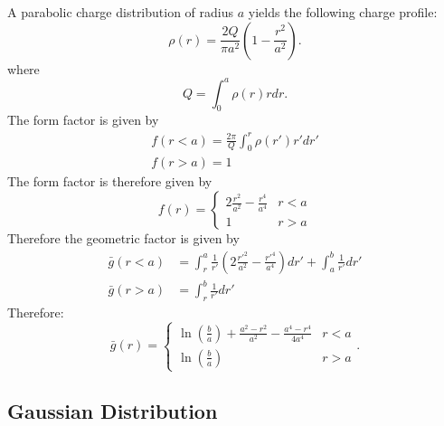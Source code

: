 A parabolic charge distribution of radius $a$ yields the following charge profile:
$$\rho(r) = \frac{2Q}{\pi a^2}\left(1-\frac{r^2}{a^2}\right).$$
where
$$Q = \int_0^a \rho(r) r dr.$$
The form factor is given by
$$\begin{aligned}f(r<a) = \frac{2\pi}{Q}\int_0^r\rho(r')r'dr' \\ f(r > a) = 1\end{aligned}$$
The form factor is therefore given by
$$f(r) = \begin{cases} 2\frac{r^2}{a^2}-\frac{r^4}{a^4} & r < a\\
1 & r > a
\end{cases}$$
Therefore the geometric factor is given by
$$\begin{aligned}
\bar{g}(r<a) & = \int_r^a \frac{1}{r'}\left(2\frac{r'^2}{a^2}-\frac{r'^4}{a^4}\right)dr'+ \int_a^b\frac{1}{r'}dr' \\
\bar{g}(r>a) &= \int_r^b\frac{1}{r'}dr'
\end{aligned}$$
Therefore:
\begin{equation}
    \bar{g}(r) = \begin{cases}
        \ln\left(\frac{b}{a}\right)+\frac{a^2-r^2}{a^2}-\frac{a^4-r^4}{4a^4} & r < a \\
        \ln(\frac{b}{a})                                                     & r > a\end{cases}
    \label{eq:g_parabolic}.
\end{equation}

\subsection{Gaussian Distribution}

